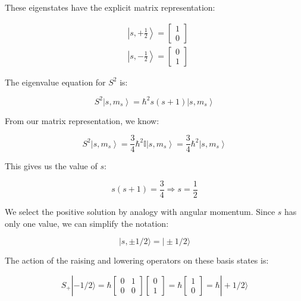 \documentclass[italian]{HKNdocument}
\begin{document}
These eigenstates have the explicit matrix representation:

\begin{align}
& \left|s,+\frac{1}{2}\right\rangle=\left[\begin{array}{l}
1 \\
0
\end{array}\right]  \\
& \left|s,-\frac{1}{2}\right\rangle=\left[\begin{array}{l}
0 \\
1
\end{array}\right]
\end{align}

The eigenvalue equation for $S^2$ is:

\begin{equation}
S^{2}\left|s, m_{s}\right\rangle=\hbar^{2} s(s+1)\left|s, m_{s}\right\rangle
\end{equation}

From our matrix representation, we know:

\begin{equation}
S^{2}\left|s, m_{s}\right\rangle=\frac{3}{4} \hbar^{2} \mathbb{I}\left|s, m_{s}\right\rangle=\frac{3}{4} \hbar^{2}\left|s, m_{s}\right\rangle
\end{equation}

This gives us the value of $s$:

\begin{equation}
s(s+1)=\frac{3}{4} \Longrightarrow s=\frac{1}{2}
\end{equation}

We select the positive solution by analogy with angular momentum. Since $s$ has only one value, we can simplify the notation:

\begin{equation}
|s, \pm 1/2\rangle=|\pm 1/2\rangle
\end{equation}

The action of the raising and lowering operators on these basis states is:

\[
S_{+}|-1/2\rangle=\hbar\left[\begin{array}{ll}
0 & 1  \\
0 & 0
\end{array}\right]\left[\begin{array}{l}
0 \\
1
\end{array}\right]=\hbar\left[\begin{array}{l}
1 \\
0
\end{array}\right]=\hbar|+1/2\rangle
\]
\end{document}
